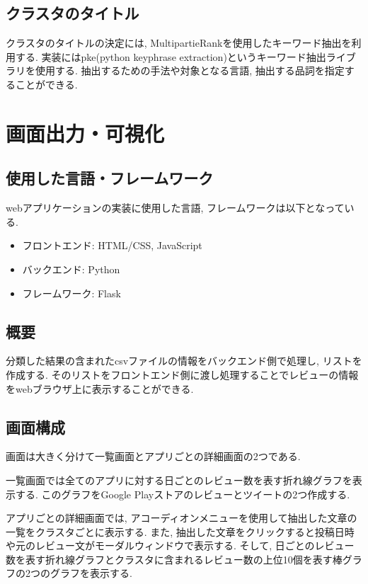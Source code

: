 \subsection{クラスタのタイトル}
クラスタのタイトルの決定には, MultipartieRankを使用したキーワード抽出を利用する. 実装にはpke(python keyphrase extraction)というキーワード抽出ライブラリを使用する. 
抽出するための手法や対象となる言語, 抽出する品詞を指定することができる. 



\section{画面出力・可視化}
\subsection{使用した言語・フレームワーク}
webアプリケーションの実装に使用した言語, フレームワークは以下となっている. 
\begin{itemize}
    \item フロントエンド: HTML/CSS, JavaScript
    \item バックエンド: Python
    \item フレームワーク: Flask
\end{itemize}

\subsection{概要}
分類した結果の含まれたcsvファイルの情報をバックエンド側で処理し, リストを作成する. そのリストをフロントエンド側に渡し処理することでレビューの情報をwebブラウザ上に表示することができる. 

\subsection{画面構成}
画面は大きく分けて一覧画面とアプリごとの詳細画面の2つである. 

一覧画面では全てのアプリに対する日ごとのレビュー数を表す折れ線グラフを表示する. 
このグラフをGoogle Playストアのレビューとツイートの2つ作成する. 

アプリごとの詳細画面では, アコーディオンメニューを使用して抽出した文章の一覧をクラスタごとに表示する. また, 抽出した文章をクリックすると投稿日時や元のレビュー文がモーダルウィンドウで表示する. 
そして, 日ごとのレビュー数を表す折れ線グラフとクラスタに含まれるレビュー数の上位10個を表す棒グラフの2つのグラフを表示する. 

